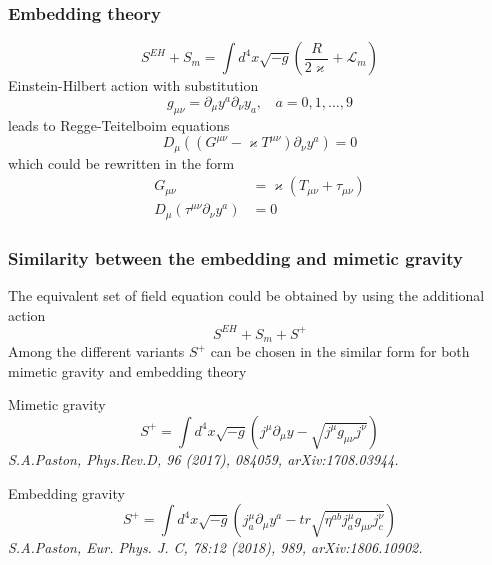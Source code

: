 \documentclass[serif,professionalfonts]{beamer}
\begin{document}
\begin{frame}
\frametitle{Embedding theory}
\begin{equation}
	S^{EH} + S_m= \int d^4x \sqrt{-g}\left( \frac{R}{2 \varkappa} + \mathcal{L}_m \right)
\end{equation}
Einstein-Hilbert action with substitution
\begin{equation}
	g_{\mu \nu} = \partial_{\mu} y^a \partial_{\nu} y_a, \ \ \ \ a = 0, 1, \ldots , 9
\end{equation}
leads to Regge-Teitelboim equations
\begin{equation}
	D_{\mu} \left( (G^{\mu \nu}-\varkappa T^{\mu \nu})\partial_{\nu}y^a\right) = 0
\end{equation}
which could be rewritten in the form
\begin{align}
	G_{\mu \nu} &= \varkappa \left( T_{\mu \nu} + \tau_{\mu \nu} \right) \\
	D_{\mu} \left(\tau^{\mu \nu} \partial_{\nu} y^a \right)& = 0
\end{align}
\end{frame}

\begin{frame}
\frametitle{Similarity between the embedding and mimetic gravity}

The equivalent set of field equation could be obtained by using the additional action
\begin{equation}
	S^{EH} + S_m + S^{+}
\end{equation}
Among the different variants $S^{+}$ can be chosen in the similar form for both mimetic gravity and embedding theory

Mimetic gravity
\begin{equation}
	S^{+} = \int d^4x \sqrt{-g} \left( j^{\mu} \partial_{\mu}y - \sqrt{j^{\mu} g_{\mu \nu} j^{\nu}}\right)
\end{equation}
\textit{\small{S.A.Paston, Phys.Rev.D, 96 (2017), 084059, arXiv:1708.03944.}}

Embedding gravity
\begin{equation}
	S^{+} = \int d^4x \sqrt{-g} \left( j^{\mu}_{a} \partial_{\mu}y^a - tr \sqrt{\eta^{ab}j^{\mu}_{a} g_{\mu \nu} j^{\nu}_{c}}\right)
\end{equation}
\textit{\small{S.A.Paston, Eur. Phys. J. C, 78:12 (2018), 989, arXiv:1806.10902.}}
\end{frame}
\end{document}
